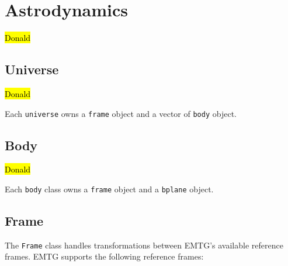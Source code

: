 \chapter{Astrodynamics}
\label{chap:astrodynamics}

\hl{Donald}

\section{Universe}
\label{sec:universe}

\hl{Donald}

Each \texttt{universe} owns a \texttt{frame} object and a vector of \texttt{body} object.

\section{Body}
\label{sec:body}

\hl{Donald}

Each \texttt{body} class owns a \texttt{frame} object and a \texttt{bplane} object.

\section{Frame}
\label{sec:frame}

The \texttt{Frame} class handles transformations between EMTG's available reference frames. EMTG supports the following reference frames:

